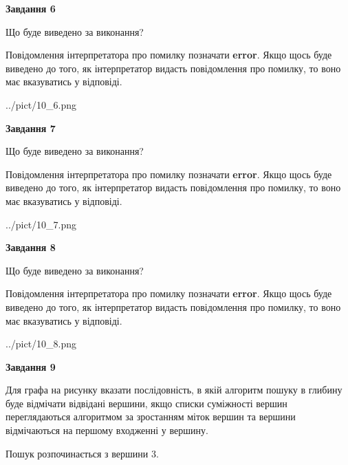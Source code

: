 \documentclass[12pt, ukrainian]{article}
\begin{document}
{\begin {large}
{\begin {center}\textbf{Завдання 6}\end {center}}\par
Що буде виведено за виконання?

Повідомлення інтерпретатора про помилку позначати \textbf{error}.
Якщо щось буде виведено до того, як інтерпретатор видасть повідомлення про помилку, 
то воно має вказуватись у відповіді. \par


\begin{center}
	{../pict/10_6.png}
\end{center}
\newpage

{\begin {center}\textbf{Завдання 7}\end {center}}\par
Що буде виведено за виконання?

Повідомлення інтерпретатора про помилку позначати \textbf{error}.
Якщо щось буде виведено до того, як інтерпретатор видасть повідомлення про помилку, 
то воно має вказуватись у відповіді. \par


\begin{center}
	{../pict/10_7.png}
\end{center}
\newpage

{\begin {center}\textbf{Завдання 8}\end {center}}\par
Що буде виведено за виконання?

Повідомлення інтерпретатора про помилку позначати \textbf{error}.
Якщо щось буде виведено до того, як інтерпретатор видасть повідомлення про помилку, 
то воно має вказуватись у відповіді. \par


\begin{center}
	{../pict/10_8.png}
\end{center}
\newpage

{\begin {center}\textbf{Завдання 9}\end {center}}\par
Для графа на рисунку вказати послідовність, в якій алгоритм пошуку в глибину буде відмічати відвідані вершини, якщо списки суміжності вершин переглядаються алгоритмом за зростанням міток вершин та вершини відмічаються на першому вход\-женні у вершину.\par
Пошук розпочинається з вершини 3.\par


\end{large}}
\end{document}
